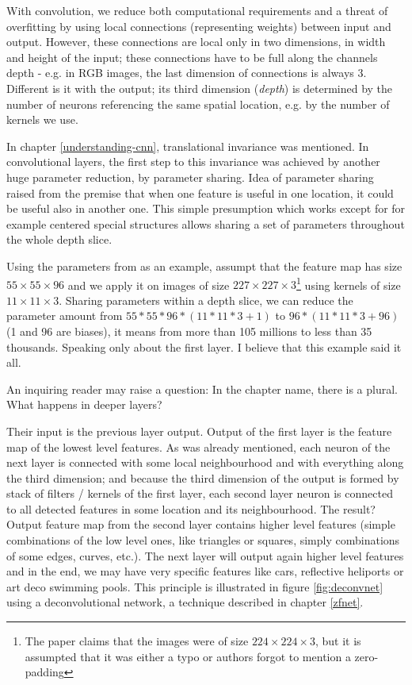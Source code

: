 With convolution, we reduce both computational requirements and a threat of overfitting by using local connections (representing weights) between input and output. However, these connections are local only in two dimensions, in width and height of the input; these connections have to be full along the channels depth - e.g. in RGB images, the last dimension of connections is always 3. Different is it with the output; its third dimension (\textit{depth}) is determined by the number of neurons referencing the same spatial location, e.g. by the number of kernels we use. 

In chapter \ref{understanding-cnn}, translational invariance was mentioned. In convolutional layers, the first step to this invariance was achieved by another huge parameter reduction, by parameter sharing. Idea of parameter sharing raised from the premise that when one feature is useful in one location, it could be useful also in another one. This simple presumption which works except for for example centered special structures allows sharing a set of parameters throughout the whole depth slice. 

Using the parameters from \cite{cnn-classification} as an example, assumpt that the feature map has size $55 \times 55 \times 96$ and we apply it on images of size $227 \times 227 \times 3$\footnote{The paper claims that the images were of size $224 \times 224 \times 3$, but it is assumpted that it was either a typo or authors forgot to mention a zero-padding} using kernels of size $11 \times 11 \times 3$. Sharing parameters within a depth slice, we can reduce the parameter amount from $55 * 55 * 96 * (11 * 11 * 3 + 1)$ to $96 * (11 * 11 * 3 + 96)$ (1 and 96 are biases), it means from more than 105 millions to less than 35 thousands. Speaking only about the first layer. I believe that this example said it all. 

An inquiring reader may raise a question: In the chapter name, there is a plural. What happens in deeper layers? 

Their input is the previous layer output. Output of the first layer is the feature map of the lowest level features. As was already mentioned, each neuron of the next layer is connected with some local neighbourhood and with everything along the third dimension; and because the third dimension of the output is formed by stack of filters / kernels of the first layer, each second layer neuron is connected to all detected features in some location and its neighbourhood. The result? Output feature map from the second layer contains higher level features (simple combinations of the low level ones, like triangles or squares, simply combinations of some edges, curves, etc.). The next layer will output again higher level features and in the end, we may have very specific features like cars, reflective heliports or art deco swimming pools. This principle is illustrated in figure \ref{fig:deconvnet} using a deconvolutional network, a technique described in chapter \ref{zfnet}.

